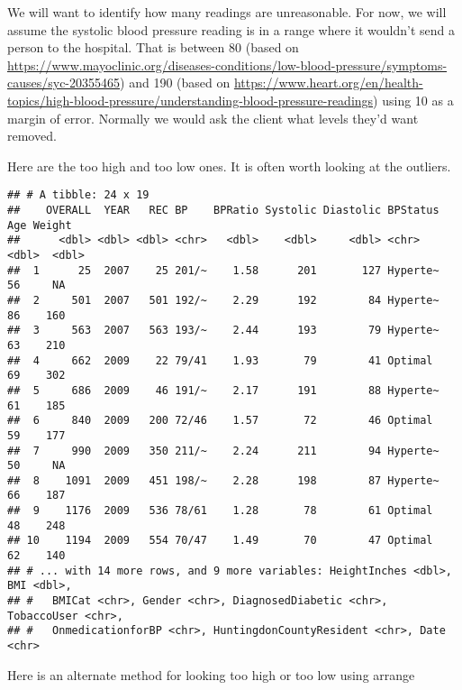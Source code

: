 \documentclass[
]{article}
\newenvironment{Shaded}{\begin{snugshade}}{\end{snugshade}}
\newcommand{\DecValTok}[1]{\textcolor[rgb]{0.00,0.00,0.81}{#1}}
\newcommand{\KeywordTok}[1]{\textcolor[rgb]{0.13,0.29,0.53}{\textbf{#1}}}
\newcommand{\NormalTok}[1]{#1}
\newcommand{\OperatorTok}[1]{\textcolor[rgb]{0.81,0.36,0.00}{\textbf{#1}}}
\begin{document}
We will want to identify how many readings are unreasonable. For now, we
will assume the systolic blood pressure reading is in a range where it
wouldn't send a person to the hospital. That is between 80 (based on
\url{https://www.mayoclinic.org/diseases-conditions/low-blood-pressure/symptoms-causes/syc-20355465})
and 190 (based on
\url{https://www.heart.org/en/health-topics/high-blood-pressure/understanding-blood-pressure-readings})
using 10 as a margin of error. Normally we would ask the client what
levels they'd want removed.

Here are the too high and too low ones. It is often worth looking at the
outliers.

\begin{Shaded}
\end{Shaded}

\begin{verbatim}
## # A tibble: 24 x 19
##    OVERALL  YEAR   REC BP    BPRatio Systolic Diastolic BPStatus   Age Weight
##      <dbl> <dbl> <dbl> <chr>   <dbl>    <dbl>     <dbl> <chr>    <dbl>  <dbl>
##  1      25  2007    25 201/~    1.58      201       127 Hyperte~    56     NA
##  2     501  2007   501 192/~    2.29      192        84 Hyperte~    86    160
##  3     563  2007   563 193/~    2.44      193        79 Hyperte~    63    210
##  4     662  2009    22 79/41    1.93       79        41 Optimal     69    302
##  5     686  2009    46 191/~    2.17      191        88 Hyperte~    61    185
##  6     840  2009   200 72/46    1.57       72        46 Optimal     59    177
##  7     990  2009   350 211/~    2.24      211        94 Hyperte~    50     NA
##  8    1091  2009   451 198/~    2.28      198        87 Hyperte~    66    187
##  9    1176  2009   536 78/61    1.28       78        61 Optimal     48    248
## 10    1194  2009   554 70/47    1.49       70        47 Optimal     62    140
## # ... with 14 more rows, and 9 more variables: HeightInches <dbl>, BMI <dbl>,
## #   BMICat <chr>, Gender <chr>, DiagnosedDiabetic <chr>, TobaccoUser <chr>,
## #   OnmedicationforBP <chr>, HuntingdonCountyResident <chr>, Date <chr>
\end{verbatim}

Here is an alternate method for looking too high or too low using
arrange
\end{document}
